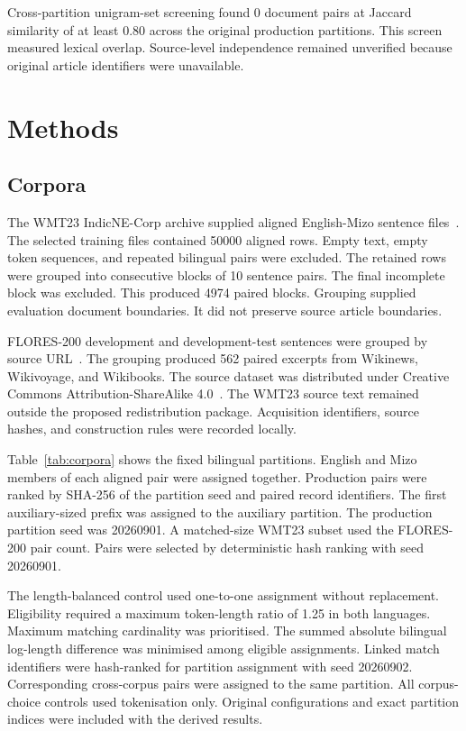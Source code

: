 \documentclass[pdflatex,sn-mathphys-num]{sn-jnl}%
\theoremstyle{thmstyleone}%
\theoremstyle{thmstyletwo}%
\theoremstyle{thmstylethree}%
\newcommand{\NearDuplicateThreshold}{0.80}
\newcommand{\NearDuplicatePairs}{0}
\newcommand{\ProductionSplitSeed}{20260901}
\newcommand{\MatchedSelectionSeed}{20260901}
\newcommand{\BalancedSplitSeed}{20260902}
\newcommand{\ProductionPairs}{4974}
\newcommand{\MatchedPairs}{562}
\newcommand{\SourceRows}{50000}
\newcommand{\SentencesPerBlock}{10}
\newcommand{\LengthRatio}{1.25}
\begin{document}
Cross-partition unigram-set screening found \NearDuplicatePairs{} document pairs at Jaccard similarity of at least \NearDuplicateThreshold{} across the original production partitions. This screen measured lexical overlap. Source-level independence remained unverified because original article identifiers were unavailable.

\section{Methods}
\subsection{Corpora}
The WMT23 IndicNE-Corp archive supplied aligned English-Mizo sentence files~\cite{indic}. The selected training files contained \SourceRows{} aligned rows. Empty text, empty token sequences, and repeated bilingual pairs were excluded. The retained rows were grouped into consecutive blocks of \SentencesPerBlock{} sentence pairs. The final incomplete block was excluded. This produced \ProductionPairs{} paired blocks. Grouping supplied evaluation document boundaries. It did not preserve source article boundaries.

FLORES-200 development and development-test sentences were grouped by source URL~\cite{flores}. The grouping produced \MatchedPairs{} paired excerpts from Wikinews, Wikivoyage, and Wikibooks. The source dataset was distributed under Creative Commons Attribution-ShareAlike 4.0~\cite{floresrepo}. The WMT23 source text remained outside the proposed redistribution package. Acquisition identifiers, source hashes, and construction rules were recorded locally.

Table~\ref{tab:corpora} shows the fixed bilingual partitions. English and Mizo members of each aligned pair were assigned together. Production pairs were ranked by SHA-256 of the partition seed and paired record identifiers. The first auxiliary-sized prefix was assigned to the auxiliary partition. The production partition seed was \ProductionSplitSeed{}. A matched-size WMT23 subset used the FLORES-200 pair count. Pairs were selected by deterministic hash ranking with seed \MatchedSelectionSeed{}.

The length-balanced control used one-to-one assignment without replacement. Eligibility required a maximum token-length ratio of \LengthRatio{} in both languages. Maximum matching cardinality was prioritised. The summed absolute bilingual log-length difference was minimised among eligible assignments. Linked match identifiers were hash-ranked for partition assignment with seed \BalancedSplitSeed{}. Corresponding cross-corpus pairs were assigned to the same partition. All corpus-choice controls used tokenisation only. Original configurations and exact partition indices were included with the derived results.
\end{document}

